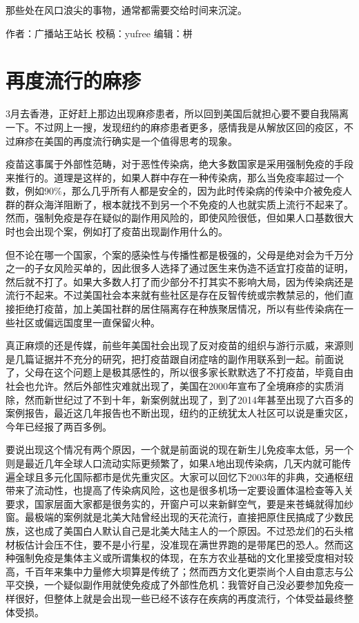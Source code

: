 \documentclass[
]{book}
\begin{document}
那些处在风口浪尖的事物，通常都需要交给时间来沉淀。

作者：广播站王站长
校稿：yufree
编辑：栟

\hypertarget{ux518dux5ea6ux6d41ux884cux7684ux9ebbux75b9}{%
\section{再度流行的麻疹}\label{ux518dux5ea6ux6d41ux884cux7684ux9ebbux75b9}}

3月去香港，正好赶上那边出现麻疹患者，所以回到美国后就担心要不要自我隔离一下。不过网上一搜，发现纽约的麻疹患者更多，感情我是从解放区回的疫区，不过麻疹在美国的再度流行确实是一个值得思考的现象。

疫苗这事属于外部性范畴，对于恶性传染病，绝大多数国家是采用强制免疫的手段来推行的。道理是这样的，如果人群中存在一种传染病，那么当免疫率超过一个数，例如90\%，那么几乎所有人都是安全的，因为此时传染病的传染中介被免疫人群的群众海洋阻断了，根本就找不到另一个不免疫的人也就实质上流行不起来了。然而，强制免疫是存在疑似的副作用风险的，即使风险很低，但如果人口基数很大时也会出现个案，例如打了疫苗出现副作用什么的。

但不论在哪一个国家，个案的感染性与传播性都是极强的，父母是绝对会为千万分之一的子女风险买单的，因此很多人选择了通过医生来伪造不适宜打疫苗的证明，然后就不打了。如果大多数人打了而少部分不打其实不影响大局，因为传染病还是流行不起来。不过美国社会本来就有些社区是存在反智传统或宗教禁忌的，他们直接拒绝打疫苗，加上美国社群的居住隔离存在种族聚居情况，所以有些传染病在一些社区或偏远国度里一直保留火种。

真正麻烦的还是传媒，前些年美国社会出现了反对疫苗的组织与游行示威，来源则是几篇证据并不充分的研究，把打疫苗跟自闭症啥的副作用联系到一起。前面说了，父母在这个问题上是极其感性的，所以很多家长默默选了不打疫苗，毕竟自由社会也允许。然后外部性灾难就出现了，美国在2000年宣布了全境麻疹的实质消除，然而新世纪过了不到十年，新案例就出现了，到了2014年甚至出现了六百多的案例报告，最近这几年报告也不断出现，纽约的正统犹太人社区可以说是重灾区，今年已经报了两百多例。

要说出现这个情况有两个原因，一个就是前面说的现在新生儿免疫率太低，另一个则是最近几年全球人口流动实际更频繁了，如果A地出现传染病，几天内就可能传遍全球且多元化国际都市是优先重灾区。大家可以回忆下2003年的非典，交通枢纽带来了流动性，也提高了传染病风险，这也是很多机场一定要设置体温检查等入关要求，国家层面大家都是很务实的，开窗户可以来新鲜空气，要是来苍蝇就得加纱窗。最极端的案例就是北美大陆曾经出现的天花流行，直接把原住民搞成了少数民族，这也成了美国白人默认自己是北美大陆主人的一个原因。不过恐龙们的石头棺材板估计会压不住，要不是小行星，没准现在满世界跑的是带尾巴的恐人。然而这种强制免疫是集体主义或所谓集权的体现，在东方农业基础的文化里接受度相对较高，千百年来集中力量修大坝算是传统了；然而西方文化更崇尚个人自由意志与公平交换，一个疑似副作用就使免疫成了外部性危机：我管好自己没必要参加免疫一样很好，但整体上就是会出现一些已经不该存在疾病的再度流行，个体受益最终整体受损。
\end{document}
